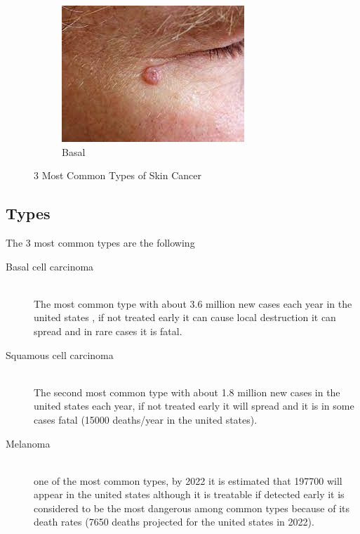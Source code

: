 \begin{figure}[h]
            \begin{subfigure}[b]{0.3\textwidth}
                \centering
                \includegraphics[scale=.5]{./chapter-01-general-medical-information/basal.jpeg}
                \caption{Basal ~\cite{epr2021}}
                \label{fig:basal}
            \end{subfigure}
        \caption{3 Most Common Types of Skin Cancer}
        \label{fig:3types}
        \end{figure}


    \subsection{Types}
        The 3 most common types are the following ~\cite{scf2022}
        \begin{description}
        \item[Basal cell carcinoma] \hfill \\
            The most common type with about 3.6 million new cases each year in the united states , if not treated early it can cause local destruction it can spread and in rare cases it is fatal.
        \item[Squamous cell carcinoma] \hfill \\
            The second most common type with about 1.8 million new cases in the united states each year, if not treated early it will spread and it is in some cases fatal (15000 deaths/year in the united states).
        \item[Melanoma] \hfill \\
            one of the most common types, by 2022 it is estimated that 197700 will appear in the united states although it is treatable if detected early it is considered to be the most dangerous among common types because of its death rates (7650 deaths projected for the united states in 2022).
        \end{description}



